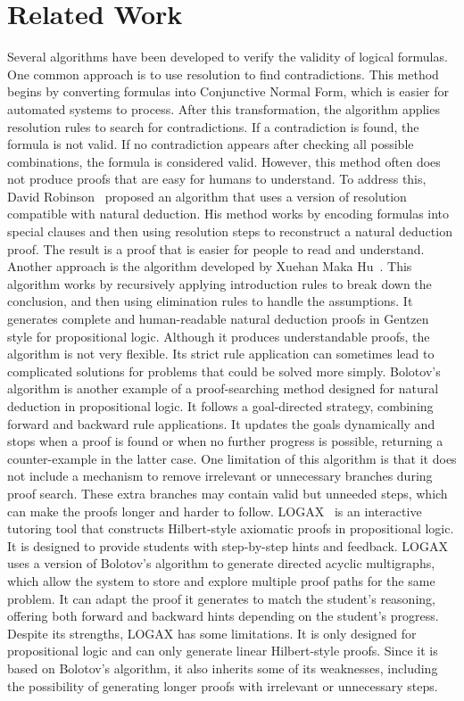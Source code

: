 \documentclass[runningheads]{llncs}
\begin{document}
\section{Related Work}
Several algorithms have been developed to verify the validity of logical formulas. One common approach is to use resolution to find contradictions. This method begins by converting formulas into Conjunctive Normal Form, which is easier for automated systems to process. After this transformation, the algorithm applies resolution rules to search for contradictions. If a contradiction is found, the formula is not valid. If no contradiction appears after checking all possible combinations, the formula is considered valid. However, this method often does not produce proofs that are easy for humans to understand.
To address this, David Robinson~\cite{robinson_using} proposed an algorithm that uses a version of resolution compatible with natural deduction. His method works by encoding formulas into special clauses and then using resolution steps to reconstruct a natural deduction proof. The result is a proof that is easier for people to read and understand.
Another approach is the algorithm developed by Xuehan Maka Hu~\cite{makahu_automatic}. This algorithm works by recursively applying introduction rules to break down the conclusion, and then using elimination rules to handle the assumptions. It generates complete and human-readable natural deduction proofs in Gentzen style for propositional logic. Although it produces understandable proofs, the algorithm is not very flexible. Its strict rule application can sometimes lead to complicated solutions for problems that could be solved more simply.
Bolotov's~\cite{bolotov_2005_automated} algorithm is another example of a proof-searching method designed for natural deduction in propositional logic. It follows a goal-directed strategy, combining forward and backward rule applications. It updates the goals dynamically and stops when a proof is found or when no further progress is possible, returning a counter-example in the latter case. One limitation of this algorithm is that it does not include a mechanism to remove irrelevant or unnecessary branches during proof search. These extra branches may contain valid but unneeded steps, which can make the proofs longer and harder to follow.
LOGAX~\cite{lodder_2020_generation} is an interactive tutoring tool that constructs Hilbert-style axiomatic proofs in propositional logic. It is designed to provide students with step-by-step hints and feedback. LOGAX uses a version of Bolotov's algorithm to generate directed acyclic multigraphs, which allow the system to store and explore multiple proof paths for the same problem. It can adapt the proof it generates to match the student's reasoning, offering both forward and backward hints depending on the student's progress. Despite its strengths, LOGAX has some limitations. It is only designed for propositional logic and can only generate linear Hilbert-style proofs. Since it is based on Bolotov's algorithm, it also inherits some of its weaknesses, including the possibility of generating longer proofs with irrelevant or unnecessary steps.
\end{document}
